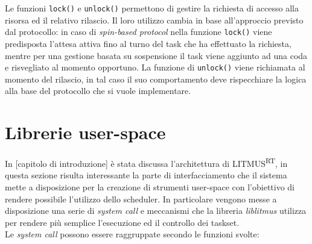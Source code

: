 \begin{appendices}
\noindent Le funzioni \texttt{lock()} e \texttt{unlock()} permettono di gestire la richiesta di accesso alla risorsa ed il relativo rilascio. Il loro utilizzo cambia in base all'approccio previsto dal protocollo: in caso di \textit{spin-based protocol} nella funzione \texttt{lock()} viene predisposta l'attesa attiva fino al turno del task che ha effettuato la richiesta, mentre per una gestione basata su sospensione il task viene aggiunto ad una coda e risvegliato al momento opportuno. La funzione di \texttt{unlock()} viene richiamata al momento del rilascio, in tal caso il suo comportamento deve rispecchiare la logica alla base del protocollo che si vuole implementare.\\

\section{Librerie user-space}
\label{sec:liblitmus}

\noindent In [capitolo di introduzione] è stata discussa l'architettura di LITMUS\textsuperscript{RT}, in questa sezione risulta interessante la parte di interfacciamento che il sistema mette a disposizione per la creazione di strumenti user-space con l'obiettivo di rendere possibile l'utilizzo dello scheduler. In particolare vengono messe a disposizione una serie di \textit{system call} e meccanismi che la libreria \textit{liblitmus} utilizza per rendere più semplice l'esecuzione ed il controllo dei taskset.\\

\noindent Le \textit{system call} possono essere raggruppate secondo le funzioni svolte: \\


\end{appendices}
